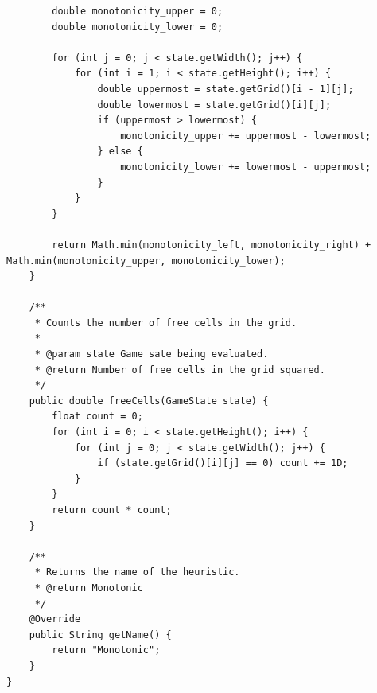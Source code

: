 \documentclass{article}
\begin{document}
\begin{verbatim}
        double monotonicity_upper = 0;
        double monotonicity_lower = 0;

        for (int j = 0; j < state.getWidth(); j++) {
            for (int i = 1; i < state.getHeight(); i++) {
                double uppermost = state.getGrid()[i - 1][j];
                double lowermost = state.getGrid()[i][j];
                if (uppermost > lowermost) {
                    monotonicity_upper += uppermost - lowermost;
                } else {
                    monotonicity_lower += lowermost - uppermost;
                }
            }
        }

        return Math.min(monotonicity_left, monotonicity_right) + Math.min(monotonicity_upper, monotonicity_lower);
    }

    /**
     * Counts the number of free cells in the grid.
     *
     * @param state Game sate being evaluated.
     * @return Number of free cells in the grid squared.
     */
    public double freeCells(GameState state) {
        float count = 0;
        for (int i = 0; i < state.getHeight(); i++) {
            for (int j = 0; j < state.getWidth(); j++) {
                if (state.getGrid()[i][j] == 0) count += 1D;
            }
        }
        return count * count;
    }

    /**
     * Returns the name of the heuristic.
     * @return Monotonic
     */
    @Override
    public String getName() {
        return "Monotonic";
    }
}
\end{verbatim}
\end{document}
